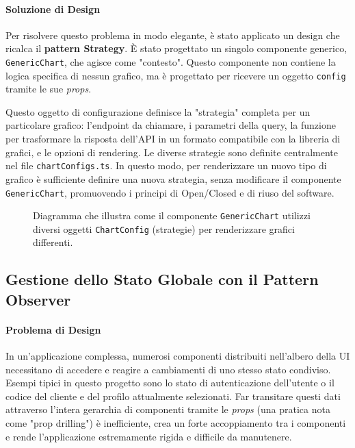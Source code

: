 \documentclass[12pt,a4paper,openright,twoside]{book}
\begin{document}
\paragraph{Soluzione di Design}
Per risolvere questo problema in modo elegante, è stato applicato un design che ricalca il \textbf{pattern Strategy}. È stato progettato un singolo componente generico, \texttt{GenericChart}, che agisce come "contesto". Questo componente non contiene la logica specifica di nessun grafico, ma è progettato per ricevere un oggetto \texttt{config} tramite le sue \textit{props}.

Questo oggetto di configurazione definisce la "strategia" completa per un particolare grafico: l'endpoint da chiamare, i parametri della query, la funzione per trasformare la risposta dell'API in un formato compatibile con la libreria di grafici, e le opzioni di rendering. Le diverse strategie sono definite centralmente nel file \texttt{chartConfigs.ts}. In questo modo, per renderizzare un nuovo tipo di grafico è sufficiente definire una nuova strategia, senza modificare il componente \texttt{GenericChart}, promuovendo i principi di Open/Closed e di riuso del software.

\vspace{1cm}
\begin{figure}[h!]
    \centering
    \caption{Diagramma che illustra come il componente \texttt{GenericChart} utilizzi diversi oggetti \texttt{ChartConfig} (strategie) per renderizzare grafici differenti.}
    \label{fig:strategy_frontend_uml}
\end{figure}
\vspace{1cm}



\subsection{Gestione dello Stato Globale con il Pattern Observer}
\label{subsec:design_observer_frontend}

\paragraph{Problema di Design}
In un'applicazione complessa, numerosi componenti distribuiti nell'albero della UI necessitano di accedere e reagire a cambiamenti di uno stesso stato condiviso. Esempi tipici in questo progetto sono lo stato di autenticazione dell'utente o il codice del cliente e del profilo attualmente selezionati. Far transitare questi dati attraverso l'intera gerarchia di componenti tramite le \textit{props} (una pratica nota come "prop drilling") è inefficiente, crea un forte accoppiamento tra i componenti e rende l'applicazione estremamente rigida e difficile da manutenere.
\end{document}
